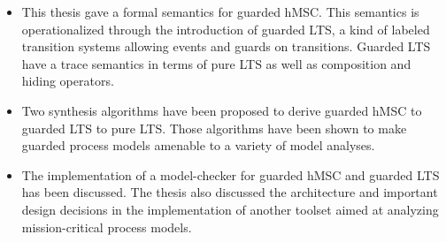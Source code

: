 \begin{itemize}
\item This thesis gave a formal semantics for guarded hMSC. This semantics is operationalized through the introduction of guarded LTS, a kind of labeled transition systems allowing events and guards on transitions. Guarded LTS have a trace semantics in terms of pure LTS as well as composition and hiding operators.
\item Two synthesis algorithms have been proposed to derive guarded hMSC to guarded LTS to pure LTS. Those algorithms have been shown to make guarded process models amenable to a variety of model analyses.
\item The implementation of a model-checker for guarded hMSC and guarded LTS has been discussed. The thesis also discussed the architecture and important design decisions in the implementation of another toolset aimed at analyzing mission-critical process models.
\end{itemize}


